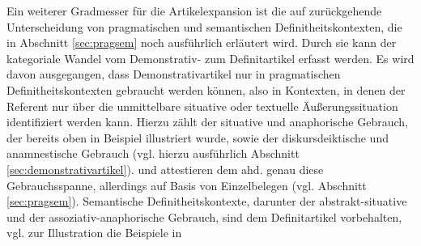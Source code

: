 Ein weiterer Gradmesser für die Artikelexpansion ist die auf \textcite{Lobner1985,Lobner1998} zurückgehende Unterscheidung von pragmatischen und semantischen Definitheitskontexten, die in Abschnitt \ref{sec:pragsem} noch ausführlich erläutert wird. Durch sie kann der kategoriale Wandel vom Demonstrativ- zum Definitartikel erfasst werden. Es wird davon ausgegangen, dass Demonstrativartikel nur in pragmatischen Definitheitskontexten gebraucht werden können, also in Kontexten, in denen der Referent nur über die unmittelbare situative oder textuelle Äußerungssituation identifiziert werden kann. Hierzu zählt der situative und anaphorische Gebrauch, der bereits oben in Beispiel  illustriert wurde, sowie der diskursdeiktische und anamnestische Gebrauch (vgl. hierzu ausführlich Abschnitt \ref{sec:demonstrativartikel}). \textcite[84--88]{Philippi1997} und \textcite[112--117]{Demske2001} attestieren dem ahd.  genau diese Gebrauchsspanne, allerdings auf Basis von Einzelbelegen (vgl. Abschnitt \ref{sec:pragsem}). Semantische Definitheitskontexte, darunter der abstrakt-situative und der assoziativ-anaphorische Gebrauch, sind dem Definitartikel vorbehalten, vgl. zur Illustration die Beispiele in 

